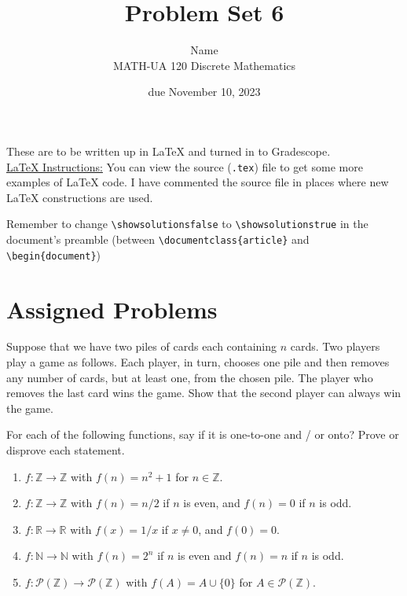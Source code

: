 \documentclass{article}
\title{Problem Set 6}
\author{%
    Name
\\  MATH-UA 120 Discrete Mathematics
}
\date{due November 10, 2023}
\newif\ifshowsolutions
\newcommand{\danger}{\marginpar[\hfill\dbend]{\dbend\hfill}}
\newcommand{\Z}{\mathbb{Z}}
\newcommand{\N}{\mathbb{N}}
\newcommand{\R}{\mathbb{R}}
\theoremstyle{definition}
\begin{document}
\maketitle



These are to be written up in \LaTeX{} and turned in to Gradescope.\\



\ifshowsolutions
    \SetupExSheets{solution/print=true}
\else
    \danger
 \underline{ \LaTeX{}  Instructions:}  You can view the source (\texttt{.tex}) file to get some more examples of \LaTeX{} code.  I have commented the source file in places where new \LaTeX{} constructions are used.
  
  Remember to change \verb|\showsolutionsfalse| to \verb|\showsolutionstrue|
    in the document's preamble 
    (between \verb|\documentclass{article}| and \verb|\begin{document}|)
\fi

\section*{Assigned Problems}


\begin{question}
    Suppose that we have two piles of cards each containing $n$ cards. Two players play a game as follows. Each player, in turn, chooses one pile and then removes any number of cards, but at least one, from the chosen pile. The player who removes the last card wins the game. Show that the second player can always win the game.
\end{question}
\begin{solution}
\end{solution}


\begin{question}
    For each of the following functions, say if it is one-to-one and / or onto? Prove or disprove each statement.
    \begin{enumerate}
	\item $f : \Z \to \Z$ with $f(n) = n^2 + 1$ for $n \in \Z$.
	\item $f : \Z \to \Z$ with $f(n) = n/2$ if $n$ is even, and $f(n) = 0$ if $n$ is odd.
	\item $f : \R \to \R$ with $f(x) = 1/x$ if $x \neq 0$, and $f(0) = 0$.
	\item $f: \N \to \N$ with $f(n) = 2^n$ if $n$ is even and $f(n) = n$ if $n$ is odd.
	\item $f : \mathcal{P}(\Z) \to \mathcal{P}(\Z)$ with $f(A) = A \cup \{ 0 \}$ for $A \in \mathcal{P}(\Z)$.
    \end{enumerate}
\end{question}
\begin{solution}
\end{solution}
\end{document}
